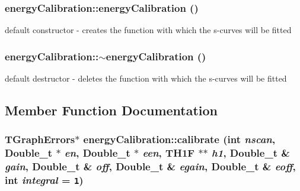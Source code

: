 \subsubsection{\setlength{\rightskip}{0pt plus 5cm}energy\-Calibration::energy\-Calibration ()}\label{classenergyCalibration_16f0658d2b526f52784057b2166efd22}


default constructor - creates the function with which the s-curves will be fitted 
\subsubsection{\setlength{\rightskip}{0pt plus 5cm}energy\-Calibration::$\sim$energy\-Calibration ()}\label{classenergyCalibration_3bae2b9c26893daa8f583758509c844f}


default destructor - deletes the function with which the s-curves will be fitted 

\subsection{Member Function Documentation}
\subsubsection{\setlength{\rightskip}{0pt plus 5cm}TGraph\-Errors$\ast$ energy\-Calibration::calibrate (int {\em nscan}, Double\_\-t $\ast$ {\em en}, Double\_\-t $\ast$ {\em een}, TH1F $\ast$$\ast$ {\em h1}, Double\_\-t \& {\em gain}, Double\_\-t \& {\em off}, Double\_\-t \& {\em egain}, Double\_\-t \& {\em eoff}, int {\em integral} = {\tt 1})\hspace{0.3cm}{\tt  [private]}}\label{classenergyCalibration_378daeddde40b6127ee6ed595506928c}


